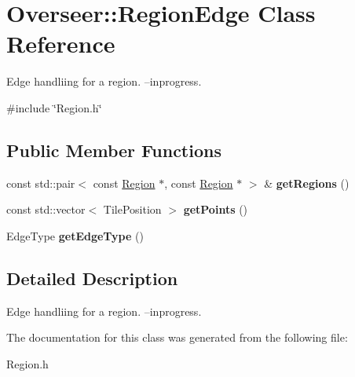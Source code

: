 \hypertarget{classOverseer_1_1RegionEdge}{}\section{Overseer\+:\+:Region\+Edge Class Reference}
\label{classOverseer_1_1RegionEdge}


Edge handliing for a region. --inprogress.  




{\ttfamily \#include \char`\"{}Region.\+h\char`\"{}}

\subsection*{Public Member Functions}
\begin{DoxyCompactItemize}
\item 
const std\+::pair$<$ const \hyperlink{classOverseer_1_1Region}{Region} $\ast$, const \hyperlink{classOverseer_1_1Region}{Region} $\ast$ $>$ \& {\bfseries get\+Regions} ()\hypertarget{classOverseer_1_1RegionEdge_ac4df47c0027b8d5fcc1de39ba53741d9}{}\label{classOverseer_1_1RegionEdge_ac4df47c0027b8d5fcc1de39ba53741d9}

\item 
const std\+::vector$<$ Tile\+Position $>$ {\bfseries get\+Points} ()\hypertarget{classOverseer_1_1RegionEdge_abdc39850cd5c84600e72d0ad557aaf44}{}\label{classOverseer_1_1RegionEdge_abdc39850cd5c84600e72d0ad557aaf44}

\item 
Edge\+Type {\bfseries get\+Edge\+Type} ()\hypertarget{classOverseer_1_1RegionEdge_ae10890eae894662fb70d394f4706ea96}{}\label{classOverseer_1_1RegionEdge_ae10890eae894662fb70d394f4706ea96}

\end{DoxyCompactItemize}


\subsection{Detailed Description}
Edge handliing for a region. --inprogress. 

The documentation for this class was generated from the following file\+:\begin{DoxyCompactItemize}
\item 
Region.\+h\end{DoxyCompactItemize}
